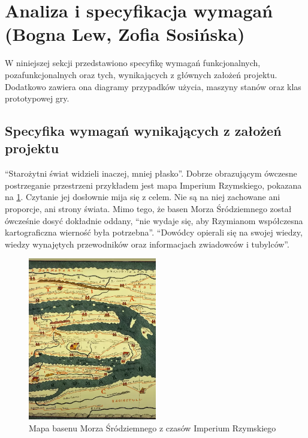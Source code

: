 \section{Analiza i specyfikacja wymagań (Bogna Lew, Zofia Sosińska)}\label{s:wymagania}
W niniejszej sekcji przedstawiono specyfikę wymagań funkcjonalnych, pozafunkcjonalnych oraz tych, wynikających z
głównych założeń projektu. Dodatkowo zawiera ona diagramy przypadków użycia, maszyny stanów oraz klas prototypowej gry.

\subsection{Specyfika wymagań wynikających z założeń projektu}
“Starożytni świat widzieli inaczej, mniej płasko”\cite{gbobrektvgry}. Dobrze obrazującym ówczesne postrzeganie
przestrzeni przykładem jest mapa Imperium Rzymskiego, pokazana na \ref{fig:mapaIR}. Czytanie jej dosłownie mija się z
celem. Nie są na niej zachowane ani proporcje, ani strony świata. Mimo tego, że basen Morza Śródziemnego został
ówcześnie dosyć dokładnie oddany, “nie wydaje się, aby Rzymianom współczesna kartograficzna wierność była potrzebna”\cite{gbobrektvgry}.
“Dowódcy opierali się na swojej wiedzy, wiedzy wynajętych przewodników oraz informacjach zwiadowców i tubylców”\cite{gbobrektvgry}.

\begin{figure}[htbp]
    \centering
    \includegraphics[width=0.5\textwidth]{images/mapaIR.png}
    \caption{Mapa basenu Morza Śródziemnego z czasów Imperium Rzymskiego}\label{fig:mapaIR}
\end{figure}

